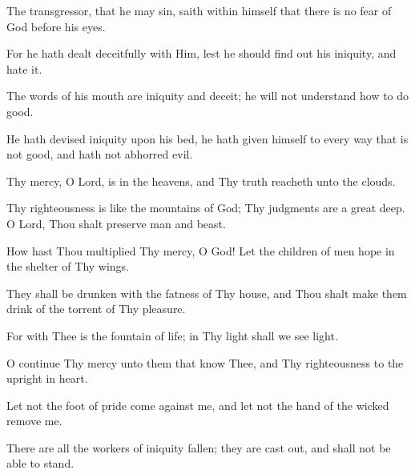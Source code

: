 The transgressor, that he may sin, saith within himself that there is no fear of God before his eyes.

For he hath dealt deceitfully with Him, lest he should find out his iniquity, and hate it.

The words of his mouth are iniquity and deceit; he will not understand how to do good.

He hath devised iniquity upon his bed, he hath given himself to every way that is not good, and hath not abhorred evil.

Thy mercy, O Lord, is in the heavens, and Thy truth reacheth unto the clouds.

Thy righteousness is like the mountains of God; Thy judgments are a great deep. O Lord, Thou shalt preserve man and beast.

How hast Thou multiplied Thy mercy, O God! Let the children of men hope in the shelter of Thy wings.

They shall be drunken with the fatness of Thy house, and Thou shalt make them drink of the torrent of Thy pleasure.

For with Thee is the fountain of life; in Thy light shall we see light.

O continue Thy mercy unto them that know Thee, and Thy righteousness to the upright in heart.

Let not the foot of pride come against me, and let not the hand of the wicked remove me.

There are all the workers of iniquity fallen; they are cast out, and shall not be able to stand.
